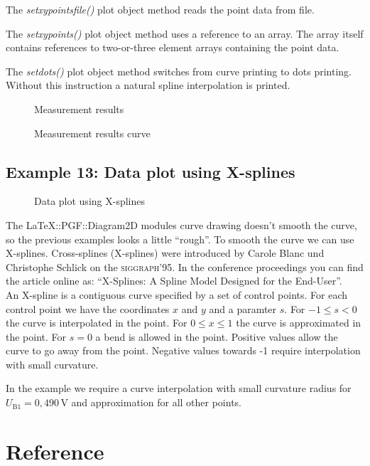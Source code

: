 \documentclass[origlongtable]{scrartcl}
\newcommand{\includepgfimage}[2]{%
\begin{figure}%
{\centering%
\caption{#2}\label{fig:#1}%
}%
\end{figure}%
}
\begin{document}
The
\textit{set\textunderscore{}xy\textunderscore{}points\textunderscore{}file()\/}
plot object method reads the point data from file.

The
\textit{set\textunderscore{}xy\textunderscore{}points()\/} plot object method
uses a reference to an array. The array itself contains references to
two-or-three element arrays containing the point data.

The
\textit{set\textunderscore{}dots()\/} plot object method switches from
curve printing to dots printing. Without this instruction a natural
spline interpolation is printed.

\clearpage
\includepgfimage{../examples/test013a}{Measurement results}
\clearpage

\clearpage
\includepgfimage{../examples/test014a}{Measurement results curve}
\clearpage

\clearpage
\subsection[X-splines]{Example 13: Data plot using X-splines}
\includepgfimage{../examples/test015a}{Data plot using X-splines}
The LaTeX::PGF::Diagram2D modules curve drawing doesn't smooth the
curve, so the previous examples looks a little ``rough''.
To smooth the curve we can use X-splines.
Cross-splines (X-splines) were introduced by Carole Blanc und Christophe Schlick
on the \textsc{siggraph}'95. In the conference proceedings you can find the
article online as:
``X-Splines: A Spline Model Designed for the End-User''.\\
An X-spline is a contiguous
curve specified by a set of control points. For each control point
we have the coordinates \(x\) and \(y\) and a paramter \(s\).
For \(-1\leq{}s<0\) the curve is interpolated in the point.
For \(0\leq{}x\leq{}1\) the curve is approximated in the point.
For \(s=0\) a bend is allowed in the point. Positive values allow
the curve to go away from the point. Negative values towards
-1 require interpolation with small curvature.

In the example we require a curve interpolation with small
curvature radius for \(U_{\text{B1}}=0,490\,\text{V}\) and
approximation for all other points.

\clearpage

\clearpage
\section{Reference}
\end{document}
